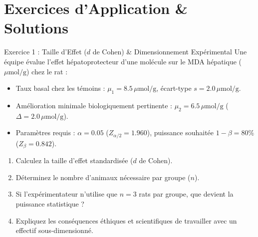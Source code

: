 \documentclass[11pt,a4paper]{article}
\begin{document}
\section{Exercices d'Application \& Solutions}

\begin{exercicebox}{Exercice 1 : Taille d'Effet ($d$ de Cohen) \& Dimensionnement Expérimental}
Une équipe évalue l'effet hépatoprotecteur d'une molécule sur le MDA hépatique ($\mu\text{mol/g}$) chez le rat :
\begin{itemize}
  \item Taux basal chez les témoins : $\mu_1 = 8.5\,\mu\text{mol/g}$, écart-type $s = 2.0\,\mu\text{mol/g}$.
  \item Amélioration minimale biologiquement pertinente : $\mu_2 = 6.5\,\mu\text{mol/g}$ ($\Delta = 2.0\,\mu\text{mol/g}$).
  \item Paramètres requis : $\alpha = 0.05$ ($Z_{\alpha/2} = 1.960$), puissance souhaitée $1 - \beta = 80\%$ ($Z_\beta = 0.842$).
\end{itemize}
\begin{enumerate}[label=\textbf{\alph*.}]
  \item Calculez la taille d'effet standardisée ($d$ de Cohen).
  \item Déterminez le nombre d'animaux nécessaire par groupe ($n$).
  \item Si l'expérimentateur n'utilise que $n = 3$ rats par groupe, que devient la puissance statistique ?
  \item Expliquez les conséquences éthiques et scientifiques de travailler avec un effectif sous-dimensionné.
\end{enumerate}
\end{exercicebox}
\end{document}
